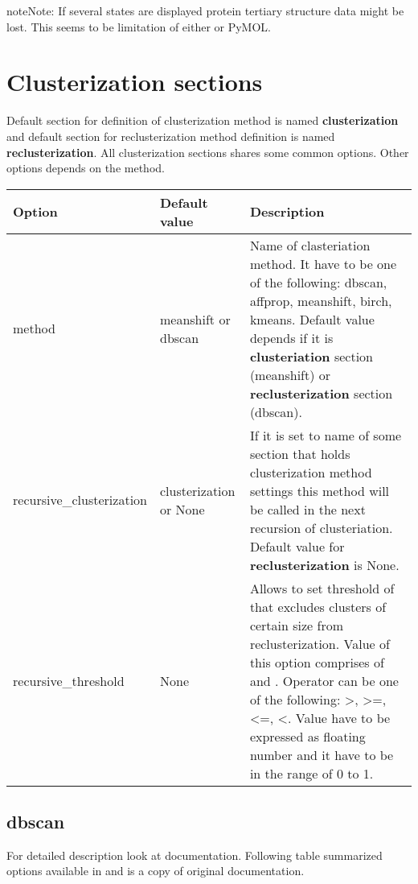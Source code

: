 \documentclass[a4paper,10pt,english]{sphinxmanual}
\begin{document}
\begin{notice}{note}{Note:}
If several states are displayed protein tertiary structure data might be lost. This seems to be limitation of either  or PyMOL.
\end{notice}


\section{Clusterization sections}
\label{valve/valve_config:clusterization-sections}\label{valve/valve_config:clusterization-options}
Default section for definition of clusterization method is named \textbf{clusterization} and default section for reclusterization method definition is named \textbf{reclusterization}. All clusterization sections shares some common options. Other options depends on the method.

\begin{tabulary}{\linewidth}{|L|L|L|}
\hline
\textsf{\relax 
Option
} & \textsf{\relax 
Default value
} & \textsf{\relax 
Description
}\\
\hline
method
 & 
meanshift or
dbscan
 & 
Name of clasteriation method. It have to be one of the
following: dbscan, affprop, meanshift, birch, kmeans. Default
value depends if it is \textbf{clusteriation} section (meanshift) or
\textbf{reclusterization} section (dbscan).
\\
\hline
recursive\_clusterization
 & 
clusterization
or None
 & 
If it is set to name of some section that holds clusterization
method settings this method will be called in the next
recursion of clusteriation. Default value for
\textbf{reclusterization} is None.
\\
\hline
recursive\_threshold
 & 
None
 & 
Allows to set threshold of that excludes clusters of certain
size from reclusterization. Value of this option comprises of
 and . Operator can be one of the following:
\textgreater{}, \textgreater{}=, \textless{}=, \textless{}. Value have to be expressed as floating number and
it have to be in the range of 0 to 1.
\\
\hline\end{tabulary}



\subsection{dbscan}
\label{valve/valve_config:dbscan}
For detailed description look at \href{http://scikit-learn.org/stable/modules/generated/sklearn.cluster.DBSCAN.html\#sklearn.cluster.DBSCAN}{} documentation. Following table summarized options available in  and is a copy of original documentation.
\end{document}
